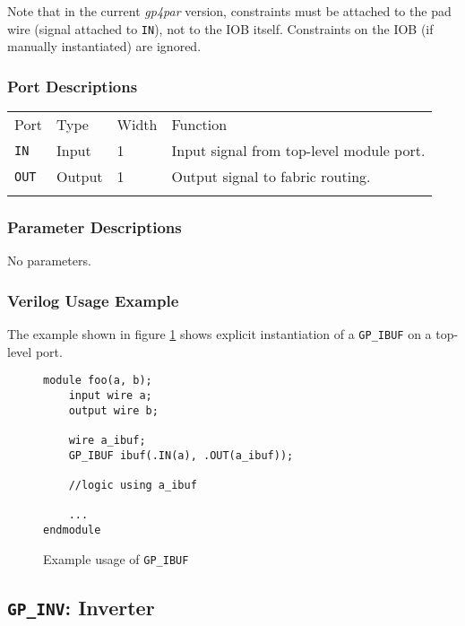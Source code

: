 \documentclass[11pt]{article}
\newcommand{\namestyle}[1]{\textit{#1}}
\newcommand{\tokenstyle}[1]{\texttt{#1}}
\newcommand{\whenstyle}[1]{{\fontseries{sb}\selectfont#1}}
\newcommand{\thinhline}{\Xhline{1\arrayrulewidth}}
\newcommand{\thickhline}{\Xhline{2.5\arrayrulewidth}}
\begin{document}
Note that in the current \namestyle{gp4par} version, constraints must be attached to the pad wire (signal attached to \tokenstyle{IN}), not
to the IOB itself. Constraints on the IOB (if manually instantiated) are ignored.

\subsubsection{Port Descriptions}

\begin{tabularx}{\textwidth}{lllX}
\thinhline
\whenstyle{Port} & \whenstyle{Type} & \whenstyle{Width} & \whenstyle{Function} \\
\thickhline
\tokenstyle{IN} & Input & 1 & Input signal from top-level module port. \\
\thinhline
\tokenstyle{OUT} & Output & 1 & Output signal to fabric routing. \\
\thinhline
\end{tabularx}

\subsubsection{Parameter Descriptions}

No parameters.

\subsubsection{Verilog Usage Example}

The example shown in figure \ref{gp-ibuf-example} shows explicit instantiation of a \tokenstyle{GP\_IBUF} on a top-level port.

\begin{figure}[h]
\begin{lstlisting}
module foo(a, b);
	input wire a;
	output wire b;

	wire a_ibuf;
	GP_IBUF ibuf(.IN(a), .OUT(a_ibuf));

	//logic using a_ibuf

	...
endmodule
\end{lstlisting}
\caption{Example usage of \tokenstyle{GP\_IBUF}}
\label{gp-ibuf-example}
\end{figure}


\pagebreak
\subsection{\tokenstyle{GP\_INV}: Inverter}
\label{gp-inv}
\end{document}
